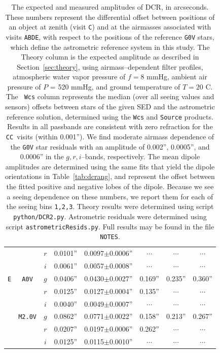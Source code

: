 \documentclass[DM,toc]{lsstdoc}
\def\A{{\tt A}}
\def\B{{\tt B}}
\def\C{{\tt C}}
\def\D{{\tt D}}
\def\E{{\tt E}}
\begin{document}
\begin{table}
\begin{tabular}{cccccccc}
   &             & $r$ & 0.0101'' & 0.0097$\pm$0.0006'' & $\cdots$ & $\cdots$ & $\cdots$ \\
   &             & $i$ & 0.0061'' & 0.0057$\pm$0.0008'' & $\cdots$ & $\cdots$ & $\cdots$ \\
\hline
\E & {\tt A0V}   & $g$ & 0.0406'' & 0.0430$\pm$0.0027'' & 0.169''  & 0.235''  & 0.360''  \\
   &             & $r$ & 0.0125'' & 0.0127$\pm$0.0004'' & 0.135''  & $\cdots$ & $\cdots$ \\
   &             & $i$ & 0.0040'' & 0.0049$\pm$0.0007'' & $\cdots$ & $\cdots$ & $\cdots$ \\
   & {\tt M2.0V} & $g$ & 0.0862'' & 0.0771$\pm$0.0022'' & 0.158''  & 0.213''  & 0.267''  \\
   &             & $r$ & 0.0207'' & 0.0197$\pm$0.0006'' & 0.262''  & $\cdots$ & $\cdots$ \\
   &             & $i$ & 0.0125'' & 0.0115$\pm$0.0010'' & $\cdots$ & $\cdots$ & $\cdots$ \\
\end{tabular}
\caption[So I can have 2 paragraphs]{The expected and measured
  amplitudes of DCR, in arcseconds.  These numbers represent the
  differential offset between positions of an object at zenith (visit
  \C) and at the airmasses associated with visits \A\B\D\E, with
  respect to the positions of the reference {\tt G0V} stars, which
  define the astrometric reference system in this study.  The Theory
  column is the expected amplitude as described in
  Section~\ref{sec:theory}, using airmass--dependent filter profiles,
  atmospheric water vapor pressure of $f=8$ mmHg, ambient air pressure
  of $P$ = 520 mmHg, and ground temperature of $T=20$ C.  The {\tt
    Wcs} column represents the median (over all seeing values and
  sensors) offsets between stars of the given SED and the astrometric
  reference solution, determined using the {\tt Wcs} and {\tt Source}
  products.  Results in all passbands are consistent with zero
  refraction for the \C\C\ visits (within 0.001'').  We find moderate
  airmass dependence of the {\tt G0V} star residuals with an amplitude
  of 0.002'', 0.0005'', and 0.0006'' in the $g,r,i$--bands,
  respectively.  The mean dipole amplitudes are determined using the
  same fits that yield the dipole orientations in
  Table~\ref{tab:dcrang}, and represent the offset between the fitted
  positive and negative lobes of the dipole.  Because we see a seeing
  dependence on these numbers, we report them for each of the seeing
  bins {\tt 1,2,3}.  Theory results were determined using script {\tt
    python/DCR2.py}.  Astrometric residuals were determined using
  script {\tt astrometricResids.py}.  Full results may be found in the
  file {\tt NOTES}.}
\label{tab:dcramp}
\end{table}
\end{document}

